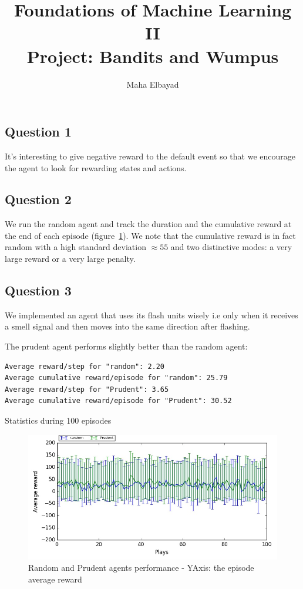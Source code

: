 \documentclass[11pt, a4paper]{article}
\author{Maha Elbayad}
\title{Foundations of Machine Learning II \\Project: Bandits and Wumpus}
\date{}
\begin{document}
\maketitle
\subsection*{Question 1}
It's interesting to give negative reward to the default event so that we encourage the agent to look for rewarding states and actions.
\subsection*{Question 2}
We run the random agent and track the duration and the cumulative reward at the end of each episode (figure~\ref{rdm}). We note that the cumulative reward is in fact random with a high standard deviation $\approx 55$ and two distinctive modes: a very large reward or a very large penalty.


\subsection*{Question 3}
We implemented an agent that uses its flash units wisely i.e only when it receives a smell signal and then moves into the same direction after flashing.

The prudent agent performs slightly better than the random agent:
\begin{listing}
\begin{verbatim}
Average reward/step for "random": 2.20
Average cumulative reward/episode for "random": 25.79
Average reward/step for "Prudent": 3.65
Average cumulative reward/episode for "Prudent": 30.52
\end{verbatim}
\caption{Statistics during 100 episodes}
\end{listing}

\begin{figure}[H]
\centering
\includegraphics[width=14cm]{randPrud}
\caption{Random and Prudent agents performance - YAxis: the episode average reward\label{rdm}}
\end{figure}
\end{document}
